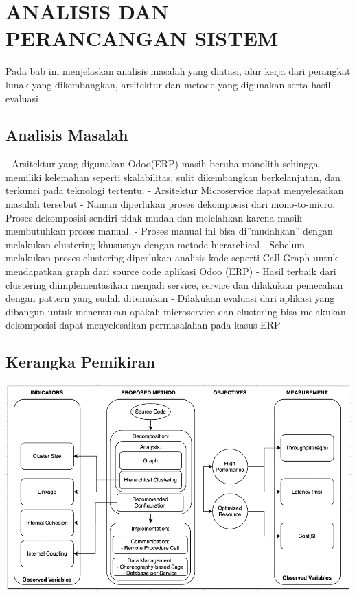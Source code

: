 \chapter{ANALISIS DAN PERANCANGAN SISTEM}
\vspace{4.5pt}

Pada bab ini menjelaskan analisis masalah yang diatasi, alur kerja dari perangkat lunak yang dikembangkan, arsitektur dan metode yang digunakan serta hasil evaluasi

\section{Analisis Masalah}



- Arsitektur yang digunakan Odoo(ERP) masih beruba monolith sehingga memiliki kelemahan seperti skalabilitas, sulit dikembangkan berkelanjutan, dan terkunci pada teknologi tertentu.
- Arsitektur Microservice dapat menyelesaikan masalah tersebut
- Namun diperlukan proses dekomposisi dari mono-to-micro. Proses dekomposisi sendiri  tidak mudah dan melelahkan karena masih membutuhkan proses manual. 
- Proses manual ini bisa di”mudahkan” dengan melakukan clustering khususnya dengan metode hierarchical 
- Sebelum melakukan proses clustering diperlukan analisis kode seperti Call Graph untuk mendapatkan graph dari source code aplikasi Odoo (ERP)
- Hasil terbaik dari clustering diimplementasikan menjadi service, service dan dilakukan pemecahan dengan pattern yang sudah ditemukan
- Dilakukan evaluasi dari aplikasi yang dibangun untuk menentukan apakah microservice dan clustering bisa melakukan dekomposisi dapat menyelesaikan permasalahan pada kasus ERP

\section{Kerangka Pemikiran}
\begin{center}
	\includegraphics[width=14cm]{img/KerangkaPemikiran.png}
	\label{fig:asd}
\end{center}

